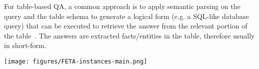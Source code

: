 \documentclass[11pt,a4paper]{article}
\newcommand{\ours}{FeTaQA\xspace}
\begin{document}
For table-based QA, a common approach is to apply semantic parsing on the query and the table schema to generate a logical form (e.g. a SQL-like database query) that can be executed to retrieve the answer from the relevant portion of the table~\cite{pasupat-liang-2015-compositional, iyyer-etal-2017-search, zhong2017seq2sql, yu-etal-2018-spider}. The answers are extracted facts/entities in the table, therefore usually in short-form. 

\begin{figure*}[h!]
  \centering
  \texttt{[image: figures/FETA-instances-main.png]}
  \caption{Examples of \textbf{\ours} instances. Only part of the original table is shown for better visualization. These examples are referred as (a), (b), (c), (d) from upper left to bottom right in the paper.}
  \label{fig:feta-instances}
\end{figure*}
\end{document}
